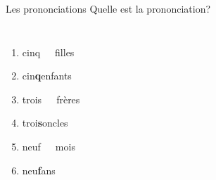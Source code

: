 \documentclass{beamer}
\begin{document}
  \begin{frame}{Les prononciations}
    Quelle est la prononciation? \\
    \begin{columns}
        \begin{enumerate}
          \item cinq\ \ \ filles
          \item cin\textbf<2->{q}enfants
          \item trois\ \ \ frères
          \item troi\textbf<3->{s}oncles
          \item neuf\ \ \ mois
          \item neu\textbf<5->{f}ans
        \end{enumerate}
        \begin{minipage}[c][0.6\textheight]{\linewidth}
          \begin{center}
          \end{center}
        \end{minipage}
    \end{columns}
  \end{frame}
\end{document}
